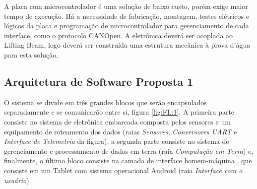 A placa com microcontrolador é uma solução de baixo custo, porém exige maior
tempo de execução. Há a necessidade de fabricação, montagem, testes elétricos e
lógicos da placa e programação de microcontrolador para gerenciamento de cada
interface, como o protocolo CANOpen.
A eletrônica deverá ser acoplada ao Lifting Beam, logo deverá ser construída uma
estrutura mecânica à prova d’água para esta solução.

\subsection{Arquitetura de Software Proposta 1}
O sistema se divide em três grandes blocos que serão encapsulados separadamente
e se comunicarão entre si, figura \ref{fig:FL:1}. A primeira parte consiste no
sistema de eletrônica embarcada composta pelos sensores e um equipamento de
roteamento dos dados (raias \emph{Sensores}, \emph{Conversores UART} e
\emph{Interface de Telemetria} da figura), a segunda parte consiste no sistema
de gerenciamento e processamento de dados em terra (raia \emph{Computação em
Terra}) e, finalmente, o último bloco consiste na camada de interface
homem-máquina , que consiste em um Tablet com sistema operacional Android (raia
\emph{Interface com o usuário}).


